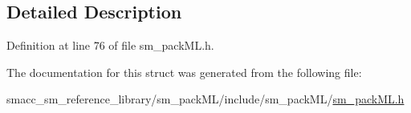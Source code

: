 \subsection{Detailed Description}


Definition at line 76 of file sm\+\_\+pack\+M\+L.\+h.



The documentation for this struct was generated from the following file\+:\begin{DoxyCompactItemize}
\item 
smacc\+\_\+sm\+\_\+reference\+\_\+library/sm\+\_\+pack\+M\+L/include/sm\+\_\+pack\+M\+L/\hyperlink{sm__packML_8h}{sm\+\_\+pack\+M\+L.\+h}\end{DoxyCompactItemize}
